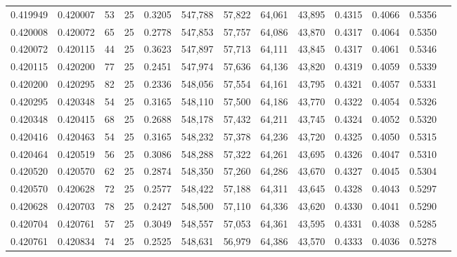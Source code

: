 \begin{tabular}{rrrrrrrrrrrrr}
0.419949 & 0.420007 &    53 &  25 &                                     0.3205 & 547,788 &  57,822 &  64,061 &  43,895 & 0.4315 & 0.4066 & 0.5356 \\
0.420008 & 0.420072 &    65 &  25 &                                     0.2778 & 547,853 &  57,757 &  64,086 &  43,870 & 0.4317 & 0.4064 & 0.5350 \\
0.420072 & 0.420115 &    44 &  25 &                                     0.3623 & 547,897 &  57,713 &  64,111 &  43,845 & 0.4317 & 0.4061 & 0.5346 \\
0.420115 & 0.420200 &    77 &  25 &                                     0.2451 & 547,974 &  57,636 &  64,136 &  43,820 & 0.4319 & 0.4059 & 0.5339 \\
0.420200 & 0.420295 &    82 &  25 &                                     0.2336 & 548,056 &  57,554 &  64,161 &  43,795 & 0.4321 & 0.4057 & 0.5331 \\
0.420295 & 0.420348 &    54 &  25 &                                     0.3165 & 548,110 &  57,500 &  64,186 &  43,770 & 0.4322 & 0.4054 & 0.5326 \\
0.420348 & 0.420415 &    68 &  25 &                                     0.2688 & 548,178 &  57,432 &  64,211 &  43,745 & 0.4324 & 0.4052 & 0.5320 \\
0.420416 & 0.420463 &    54 &  25 &                                     0.3165 & 548,232 &  57,378 &  64,236 &  43,720 & 0.4325 & 0.4050 & 0.5315 \\
0.420464 & 0.420519 &    56 &  25 &                                     0.3086 & 548,288 &  57,322 &  64,261 &  43,695 & 0.4326 & 0.4047 & 0.5310 \\
0.420520 & 0.420570 &    62 &  25 &                                     0.2874 & 548,350 &  57,260 &  64,286 &  43,670 & 0.4327 & 0.4045 & 0.5304 \\
0.420570 & 0.420628 &    72 &  25 &                                     0.2577 & 548,422 &  57,188 &  64,311 &  43,645 & 0.4328 & 0.4043 & 0.5297 \\
0.420628 & 0.420703 &    78 &  25 &                                     0.2427 & 548,500 &  57,110 &  64,336 &  43,620 & 0.4330 & 0.4041 & 0.5290 \\
0.420704 & 0.420761 &    57 &  25 &                                     0.3049 & 548,557 &  57,053 &  64,361 &  43,595 & 0.4331 & 0.4038 & 0.5285 \\
0.420761 & 0.420834 &    74 &  25 &                                     0.2525 & 548,631 &  56,979 &  64,386 &  43,570 & 0.4333 & 0.4036 & 0.5278 \\

\end{tabular}
